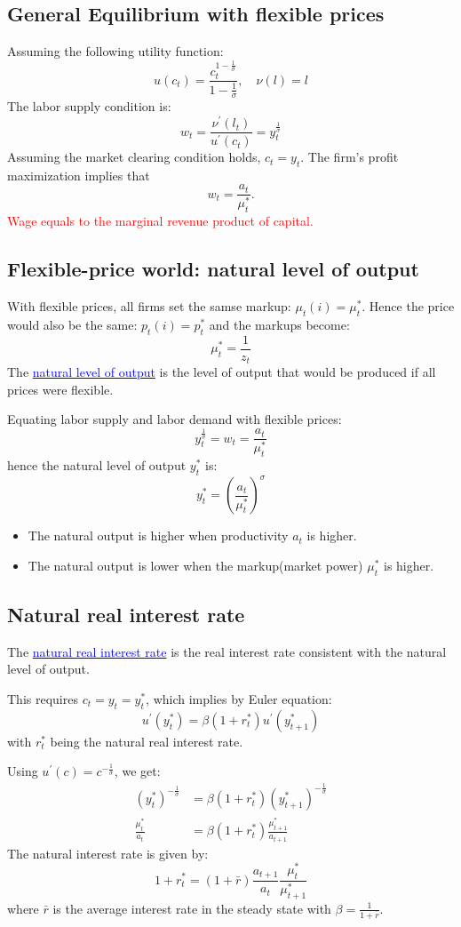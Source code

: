 \subsection{General Equilibrium with flexible prices}

Assuming the following utility function:
\[
u(c_t) = \frac{c_t^{1-\frac{1}{\sigma}}}{1-\frac{1}{\sigma}}, \quad \nu(l) = l
\]
The labor supply condition is:
\[
w_t = \frac{\nu^{\prime}(l_t)}{u^{\prime}(c_t)} = y_t^{\frac{1}{\sigma}}
\]
Assuming the market clearing condition holds, $c_t = y_t$.
The firm's profit maximization implies that 
\[
w_t = \frac{a_t}{\mu_t^*}.
\]
\textcolor{red}{Wage equals to the marginal revenue product of capital.}

\subsection{Flexible-price world: natural level of output}
With flexible prices, all firms set the samse markup: $\mu_t(i) = \mu_t^*$.
Hence the price would also be the same: $p_t(i) = p_t^*$ and the markups
become:
\[
\mu_t^* = \frac{1}{z_t}
\]
The \underline{\textcolor{blue}{natural level of output}} is the level of output that would be produced if all prices were flexible.

Equating labor supply and labor demand with ﬂexible prices:
\[
y_t^{\frac{1}{\sigma}} = w_t = \frac{a_t}{\mu_t^*}
\]
hence the natural level of output $y_t^*$ is:
\[
y_t^* = \left( \frac{a_t}{\mu_t^*} \right)^{\sigma}
\]
\begin{itemize}
    \item The natural output is higher when productivity $a_t$ is higher.
    \item The natural output is lower when the markup(market power) $\mu_t^*$ is higher.
\end{itemize}

\subsection{Natural real interest rate}
The \underline{\textcolor{blue}{natural real interest rate}} is the real interest rate consistent with the natural level of output.

This requires $c_t = y_t = y_t^*$, which implies by Euler equation:
\[
u^{\prime} (y_t^*) = \beta (1+r_t^*)u^{\prime} (y_{t+1}^*)
\]
with $r_t^*$ being the natural real interest rate.

Using $u^{\prime}(c) = c^{-\frac{1}{\sigma}}$, we get:
\begin{align*}
    \left(y_t^{*}\right)^{-\frac{1}{\sigma}} &= \beta (1+r_t^*)\left(y_{t+1}^*\right)^{-\frac{1}{\sigma}}\\
    \frac{\mu_t^*}{a_t} &= \beta (1+r_t^*)\frac{\mu_{t+1}^*}{a_{t+1}}
\end{align*}
The natural interest rate is given by:
\[
1 + r_t^* = (1+\bar{r}) \frac{a_{t+1}}{a_t} \frac{\mu_t^*}{ \mu_{t+1}^*}
\]
where $\bar{r}$ is the average interest rate in the steady state with $\beta = \frac{1}{1+\overline{r}}$.


